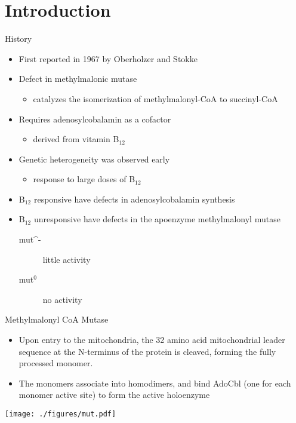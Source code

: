 \documentclass[presentation, smaller]{beamer}
\begin{document}
\section{Introduction}
\label{sec:orgheadline11}
\begin{frame}[label={sec:orgheadline1}]{History}
\begin{itemize}
\item First reported in 1967 by Oberholzer and Stokke
\item Defect in methylmalonic mutase
\begin{itemize}
\item catalyzes the isomerization of methylmalonyl-CoA to succinyl-CoA
\end{itemize}
\item Requires adenosylcobalamin as a cofactor
\begin{itemize}
\item derived from vitamin B\(_{\text{12}}\)
\end{itemize}
\item Genetic heterogeneity was observed early
\begin{itemize}
\item response to large doses of B\(_{\text{12}}\)
\end{itemize}
\item B\(_{\text{12}}\) responsive have defects in adenosylcobalamin synthesis
\item B\(_{\text{12}}\) unresponsive have defects in the apoenzyme methylmalonyl mutase
\begin{description}
\item[{mut\^{}-}] little activity
\item[{mut\(^{\text{0}}\)}] no activity
\end{description}
\end{itemize}
\end{frame}

\begin{frame}[label={sec:orgheadline2}]{Methylmalonyl CoA Mutase}
\begin{itemize}
\item Upon entry to the mitochondria, the 32 amino acid mitochondrial
leader sequence at the N-terminus of the protein is cleaved, forming
the fully processed monomer.
\item The monomers associate into homodimers, and bind AdoCbl (one
for each monomer active site) to form the active holoenzyme
\end{itemize}

\texttt{[image: ./figures/mut.pdf]}
\end{frame}
\end{document}
